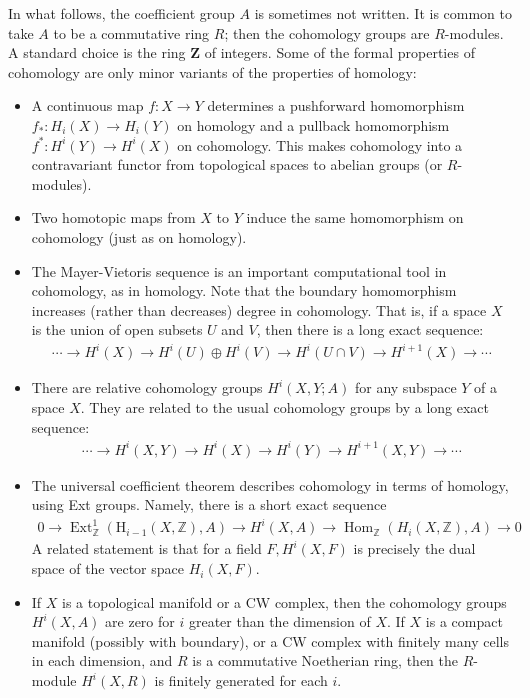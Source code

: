 In what follows, the coefficient group $A$ is sometimes not written. It is common to take $A$ to be a commutative ring $R$; then the cohomology groups are $R$-modules. A standard choice is the ring $\mathbf{Z}$ of integers.
Some of the formal properties of cohomology are only minor variants of the properties of homology:
\begin{itemize}
  \item A continuous map $f: X \rightarrow Y$ determines a pushforward homomorphism $f_*\colon H_i(X) \rightarrow H_i(Y)$ on homology and a pullback homomorphism $f^*\colon H^i(Y) \rightarrow H^i(X)$ on cohomology. This makes cohomology into a contravariant functor from topological spaces to abelian groups (or $R$-modules).
  \item Two homotopic maps from $X$ to $Y$ induce the same homomorphism on cohomology (just as on homology).
  \item The Mayer-Vietoris sequence is an important computational tool in cohomology, as in homology. Note that the boundary homomorphism increases (rather than decreases) degree in cohomology. That is, if a space $X$ is the union of open subsets $U$ and $V$, then there is a long exact sequence:
  \begin{align*}
  \cdots \rightarrow H^i(X) \rightarrow H^i(U) \oplus H^i(V) \rightarrow H^i(U \cap V) \rightarrow H^{i+1}(X) \rightarrow \cdots
  \end{align*}
  \item There are relative cohomology groups $H^i(X, Y ; A)$ for any subspace $Y$ of a space $X$. They are related to the usual cohomology groups by a long exact sequence:
  \begin{align*}
  \cdots \rightarrow H^i(X, Y) \rightarrow H^i(X) \rightarrow H^i(Y) \rightarrow H^{i+1}(X, Y) \rightarrow \cdots
  \end{align*}
  \item The universal coefficient theorem describes cohomology in terms of homology, using Ext groups. Namely, there is a short exact sequence
  \begin{align*}
  0 \rightarrow \operatorname{Ext}_{\mathbb{Z}}^1\left(\mathrm{H}_{i-1}(X, \mathbb{Z}), A\right) \rightarrow H^i(X, A) \rightarrow \operatorname{Hom}_{\mathbb{Z}}\left(H_i(X, \mathbb{Z}), A\right) \rightarrow 0
  \end{align*}
  A related statement is that for a field $F, H^i(X, F)$ is precisely the dual space of the vector space $H_i(X, F)$.
  \item If $X$ is a topological manifold or a CW complex, then the cohomology groups $H^i(X, A)$ are zero for $i$ greater than the dimension of $X$. If $X$ is a compact manifold (possibly with boundary), or a CW complex with finitely many cells in each dimension, and $R$ is a commutative Noetherian ring, then the $R$-module $H^i(X, R)$ is finitely generated for each $i$.
\end{itemize}

